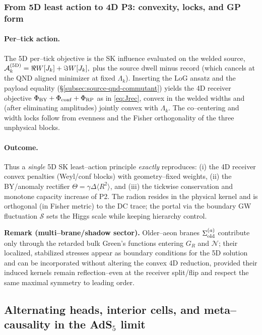 \documentclass[10pt]{article}
\theoremstyle{definition}
\theoremstyle{plain}
\begin{document}
\subsubsection{From 5D least action to 4D P3: convexity, locks, and GP form}
\label{subsubsec:5D-to-4D}

\paragraph{Per–tick action.}\label{par:uom-main-091}
The 5D per–tick objective is the SK influence evaluated on the welded source,
\(
\mathcal A^{\rm (5D)}_k=\Re W[J_k]+\Im W[J_k],
\)
plus the source dwell minus record (which cancels at the QND aligned minimizer at fixed $\Lambda_k$).
Inserting the LoG ansatz and the payload equality (\S\ref{subsec:source-qnd-commutant}) yields the 4D receiver objective
\(
\Phi_{\rm BY}+\Phi_{\rm conf}+\Phi_{\rm RP}
\)
as in \eqref{eq:Jrec}, convex in the welded widths and (after eliminating amplitudes) jointly convex with $\Lambda_k$.
The co–centering and width locks follow from evenness and the Fisher orthogonality of the three unphysical blocks.

\paragraph{Outcome.}\label{par:uom-main-092}
Thus a \emph{single} 5D SK least–action principle \emph{exactly} reproduces:
(i) the 4D receiver convex penalties (Weyl/conf blocks) with geometry–fixed weights, 
(ii) the BY/anomaly rectifier $\Theta=\gamma\Delta\!\langle R^2\rangle$, and 
(iii) the tickwise conservation and monotone capacity increase of P2.
The radion resides in the physical kernel and is orthogonal (in Fisher metric) to the DC trace; the portal via the boundary GW fluctuation $\mathcal S$ sets the Higgs scale while keeping hierarchy control.

\medskip
\noindent\textbf{Remark (multi–brane/shadow sector).}
Older–aeon branes $\Sigma_{\rm old}^{(a)}$ contribute only through the retarded bulk Green's functions entering $G_R$ and $\mathcal N$; their localized, stabilized stresses appear as boundary conditions for the 5D solution and can be incorporated without altering the convex 4D reduction, provided their induced kernels remain reflection–even at the receiver split/flip and respect the same maximal symmetry to leading order.

\subsection{\texorpdfstring{Alternating heads, interior cells, and meta--causality in the AdS$_5$ limit}{Alternating heads, interior cells, and meta--causality in the AdS5 limit}}
\label{subsec:alternating-heads}
\end{document}

